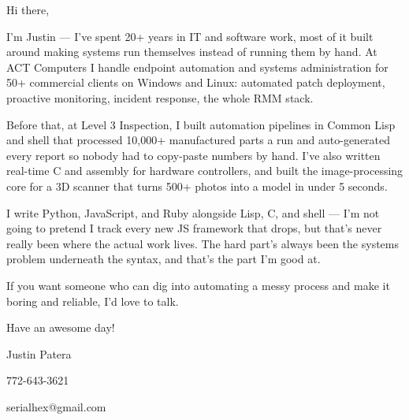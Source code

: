 
Hi there,

\smallskip

I'm Justin — I've spent 20+ years in IT and software work, most of it built
around making systems run themselves instead of running them by hand. At
ACT Computers I handle endpoint automation and systems administration for
50+ commercial clients on Windows and Linux: automated patch deployment,
proactive monitoring, incident response, the whole RMM stack.

\smallskip

Before that, at Level 3 Inspection, I built automation pipelines in Common
Lisp and shell that processed 10,000+ manufactured parts a run and
auto-generated every report so nobody had to copy-paste numbers by hand.
I've also written real-time C and assembly for hardware controllers, and
built the image-processing core for a 3D scanner that turns 500+ photos into
a model in under 5 seconds.

\smallskip

I write Python, JavaScript, and Ruby alongside Lisp, C, and shell — I'm not
going to pretend I track every new JS framework that drops, but that's never
really been where the actual work lives. The hard part's always been the
systems problem underneath the syntax, and that's the part I'm good at.

\smallskip

If you want someone who can dig into automating a messy process and make it
boring and reliable, I'd love to talk.

\smallskip

Have an awesome day!

\smallskip

Justin Patera

772-643-3621

serialhex@gmail.com

